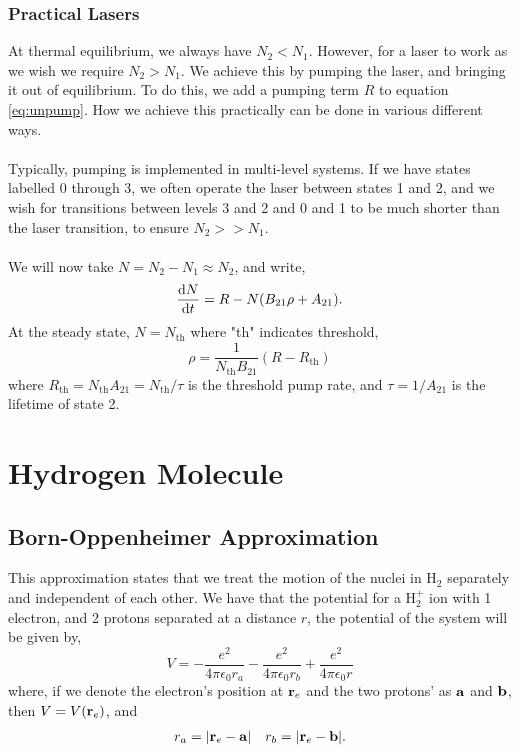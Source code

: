 \documentclass{book}
\begin{document}
\subsection{Practical Lasers}
At thermal equilibrium, we always have $N_2 < N_1$. However, for a laser to work as we wish we require $N_2 > N_1$. We achieve this by pumping the laser, and bringing it out of equilibrium. To do this, we add a pumping term $R$ to equation \eqref{eq:unpump}. How we achieve this practically can be done in various different ways. 
\\\\
Typically, pumping is implemented in multi-level systems. If we have states labelled 0 through 3, we often operate the laser between states 1 and 2, and we wish for transitions between levels 3 and 2 and 0 and 1 to be much shorter than the laser transition, to ensure $N_2 >> N_1$.
\\\\
We will now take $N = N_2 - N_1 \approx N_2$, and write,
\begin{equation}
	\dv{N}{t} = R - N(B_{21}\rho + A_{21}).
\end{equation} 
At the steady state, $N = N_{\text{th}}$ where "th" indicates threshold,
\begin{equation}
	\rho = \frac{1}{N_{\text{th}}B_{21}}(R - R_{\text{th}})
\end{equation}
where $R_{\text{th}} = N_{\text{th}}A_{21} = N_{\text{th}}/\tau$ is the threshold pump rate, and $\tau = 1/A_{21}$ is the lifetime of state 2.
\chapter{Hydrogen Molecule}
\section{Born-Oppenheimer Approximation}
This approximation states that we treat the motion of the nuclei in H$_2$ separately and independent of each other. We have that the potential for a H$_2^+$ ion with 1 electron, and 2 protons separated at a distance $r$, the potential of the system will be given by,
\begin{equation}
	V = -\frac{e^2}{4\pi\epsilon_0r_a} - \frac{e^2}{4\pi\epsilon_0r_b} +\frac{e^2}{4\pi\epsilon_0r}
\end{equation}
where, if we denote the electron's position at $\vb{r}_e$ and the two protons' as $\vb{a}$ and $\vb{b}$, then $V = V(\vb{r}_e)$, and
\begin{align}
	r_a = |\vb{r}_e - \vb{a}| && r_b = |\vb{r}_e - \vb{b}|.
\end{align}
\end{document}
